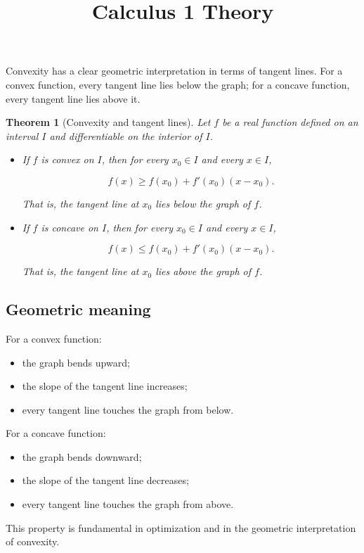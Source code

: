 \documentclass[11pt,a4paper]{article} \usepackage[T1]{fontenc}
\theoremstyle{plain} \newtheorem{theorem}{Theorem} \title{Calculus 1 Theory}
\begin{document}
Convexity has a clear geometric interpretation in terms of tangent lines. For a
convex function, every tangent line lies below the graph; for a concave
function, every tangent line lies above it.

\begin{theorem}
[Convexity and tangent lines] Let $f$ be a real function defined on an interval
$I$ and differentiable on the interior of $I$.

\begin{itemize}
\item If $f$ is convex on $I$, then for every $x_0 \in I$ and every $x \in I$,

\[
f(x) \ge f(x_0) + f'(x_0)(x - x_0).
\]

That is, the tangent line at $x_0$ lies below the graph of $f$.
\item If $f$ is concave on $I$, then for every $x_0 \in I$ and every $x \in I$,

\[
f(x) \le f(x_0) + f'(x_0)(x - x_0).
\]

That is, the tangent line at $x_0$ lies above the graph of $f$.
\end{itemize}

\end{theorem}

\subsection*{Geometric meaning}

For a convex function:

\begin{itemize}
\item the graph bends upward;
\item the slope of the tangent line increases;
\item every tangent line touches the graph from below.
\end{itemize}

For a concave function:

\begin{itemize}
\item the graph bends downward;
\item the slope of the tangent line decreases;
\item every tangent line touches the graph from above.
\end{itemize}

This property is fundamental in optimization and in the geometric
interpretation of convexity.
\end{document}
